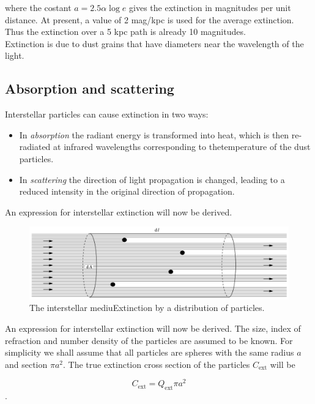 \documentclass[a4paper,11pt,twoside]{book}
\begin{document}
where the costant $a = 2.5\alpha \log e$ gives the extinction in magnitudes per unit distance. At present, a value of 2 mag/kpc is used for the average extinction. Thus the extinction over a 5 kpc path is already 10 magnitudes.\\

Extinction is due to dust grains that have diameters near the wavelength of the light.

\subsection{Absorption and scattering}

Interstellar particles can cause extinction in
two ways: 
\begin{itemize}
	\item In \textit{absorption} the radiant energy is transformed into heat, which is then re-radiated
	at infrared wavelengths corresponding to thetemperature of the dust particles.
	\item In \textit{scattering} the direction of light propagation
	is changed, leading to a reduced intensity in
	the original direction of propagation.
\end{itemize}

An expression for interstellar extinction will
now be derived.

\begin{figure}[H]
	\centering
	\includegraphics[width=\linewidth]{images/extinction_by_distribuction_of_particles.jpg}
	\caption{The interstellar
		mediuExtinction by a distribution of particles.}
	\label{fig:extinction_by_distribuction_of_particles}
\end{figure}

An expression for interstellar extinction will
now be derived. The size, index of refraction and number density of the particles are assumed to be known. For simplicity we shall assume that all
particles are spheres with the same radius $a$ and section $\pi a^2$. The true extinction cross section of the particles $C_\textrm{ext}$ will be

\begin{equation}
	C_\textrm{ext}=Q_\textrm{ext}\pi a^2
\end{equation}.
\end{document}
